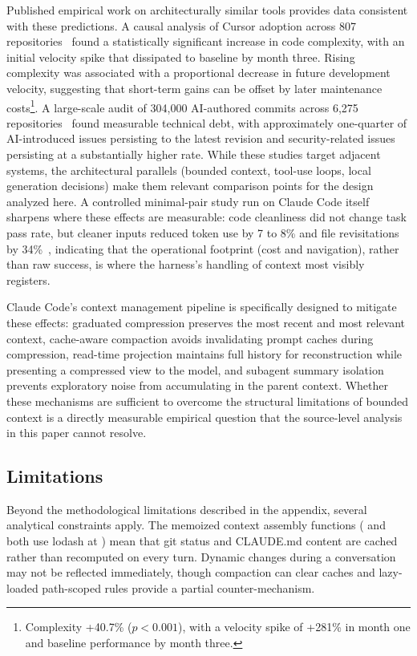 Published empirical work on architecturally similar tools provides data consistent with these predictions. A causal analysis of Cursor adoption across 807 repositories~\citep{he2026cursor} found a statistically significant increase in code complexity, with an initial velocity spike that dissipated to baseline by month three. Rising complexity was associated with a proportional decrease in future development velocity, suggesting that short-term gains can be offset by later maintenance costs\footnote{Complexity +40.7\% ($p < 0.001$), with a velocity spike of +281\% in month one and baseline performance by month three.}. A large-scale audit of 304,000 AI-authored commits across 6,275 repositories~\citep{liu2026techdebt} found measurable technical debt, with approximately one-quarter of AI-introduced issues persisting to the latest revision and security-related issues persisting at a substantially higher rate. While these studies target adjacent systems, the architectural parallels (bounded context, tool-use loops, local generation decisions) make them relevant comparison points for the design analyzed here. A controlled minimal-pair study run on Claude Code itself sharpens where these effects are measurable: code cleanliness did not change task pass rate, but cleaner inputs reduced token use by 7 to 8\% and file revisitations by 34\%~\citep{trivedi2026cleanliness}, indicating that the operational footprint (cost and navigation), rather than raw success, is where the harness's handling of context most visibly registers.

Claude Code's context management pipeline is specifically designed to mitigate these effects: graduated compression preserves the most recent and most relevant context, cache-aware compaction avoids invalidating prompt caches during compression, read-time projection maintains full history for reconstruction while presenting a compressed view to the model, and subagent summary isolation prevents exploratory noise from accumulating in the parent context. Whether these mechanisms are sufficient to overcome the structural limitations of bounded context is a directly measurable empirical question that the source-level analysis in this paper cannot resolve.

\subsection{Limitations}
\label{sec:discuss:limits}

Beyond the methodological limitations described in the appendix, several analytical constraints apply. The memoized context assembly functions ( and  both use lodash  at ) mean that git status and CLAUDE.md content are cached rather than recomputed on every turn. Dynamic changes during a conversation may not be reflected immediately, though compaction can clear caches and lazy-loaded path-scoped rules provide a partial counter-mechanism.

